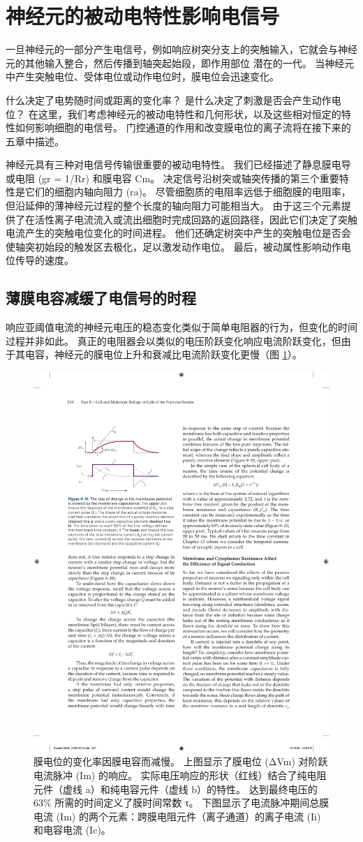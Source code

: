 \section{神经元的被动电特性影响电信号}

一旦神经元的一部分产生电信号，例如响应树突分支上的突触输入，它就会与神经元的其他输入整合，然后传播到轴突起始段，即作用部位 潜在的一代。
当神经元中产生突触电位、受体电位或动作电位时，膜电位会迅速变化。


什么决定了电势随时间或距离的变化率？
是什么决定了刺激是否会产生动作电位？
在这里，我们考虑神经元的被动电特性和几何形状，以及这些相对恒定的特性如何影响细胞的电信号。 
门控通道的作用和改变膜电位的离子流将在接下来的五章中描述。


神经元具有三种对电信号传输很重要的被动电特性。 
我们已经描述了静息膜电导或电阻 (gr = 1/Rr) 和膜电容 Cm。 
决定信号沿树突或轴突传播的第三个重要特性是它们的细胞内轴向阻力 (ra)。 
尽管细胞质的电阻率远低于细胞膜的电阻率，但沿延伸的薄神经元过程的整个长度的轴向阻力可能相当大。 
由于这三个元素提供了在活性离子电流流入或流出细胞时完成回路的返回路径，因此它们决定了突触电流产生的突触电位变化的时间进程。 
他们还确定树突中产生的突触电位是否会使轴突初始段的触发区去极化，足以激发动作电位。 
最后，被动属性影响动作电位传导的速度。


\subsection{薄膜电容减缓了电信号的时程}
响应亚阈值电流的神经元电压的稳态变化类似于简单电阻器的行为，但变化的时间过程并非如此。 
真正的电阻器会以类似的电压阶跃变化响应电流阶跃变化，但由于其电容，神经元的膜电位上升和衰减比电流阶跃变化更慢（图 \ref{fig:9_10}）。

\begin{figure}[htbp]
	\centering
	\includegraphics[width=0.5\linewidth]{chap09/fig_9_10}
	\caption{膜电位的变化率因膜电容而减慢。 上图显示了膜电位 (ΔVm) 对阶跃电流脉冲 (Im) 的响应。 实际电压响应的形状（红线）结合了纯电阻元件（虚线 a）和纯电容元件（虚线 b）的特性。 达到最终电压的 63\% 所需的时间定义了膜时间常数 τ。 下图显示了电流脉冲期间总膜电流 (Im) 的两个元素：跨膜电阻元件（离子通道）的离子电流 (Ii) 和电容电流 (Ic)。}
	\label{fig:9_10}
\end{figure}



